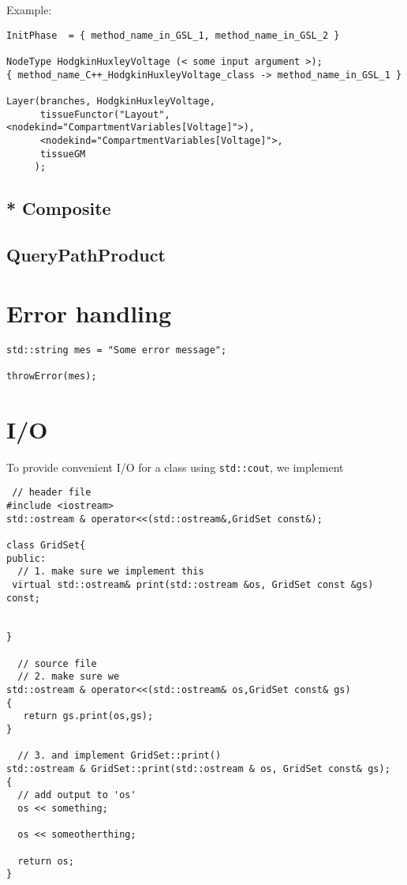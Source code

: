 Example:
\begin{verbatim}
InitPhase  = { method_name_in_GSL_1, method_name_in_GSL_2 }

NodeType HodgkinHuxleyVoltage (< some input argument >); 
{ method_name_C++_HodgkinHuxleyVoltage_class -> method_name_in_GSL_1 }

Layer(branches, HodgkinHuxleyVoltage, 
      tissueFunctor("Layout", <nodekind="CompartmentVariables[Voltage]">),
      <nodekind="CompartmentVariables[Voltage]">, 
      tissueGM
     );

\end{verbatim}


\subsection{* Composite}
\label{sec:GSL-script-Composite}
\label{sec:GSL-repertoire-composite}


\subsection{QueryPathProduct}





\section{Error handling}

\begin{verbatim}
std::string mes = "Some error message";

throwError(mes);
\end{verbatim}

\section{I/O }
\label{sec:NTS-IO-classes}
\label{sec:GSL-IO-classes}

To provide convenient I/O for a class using \verb!std::cout!, we implement
\begin{verbatim}
 // header file
#include <iostream>
std::ostream & operator<<(std::ostream&,GridSet const&);

class GridSet{
public:
  // 1. make sure we implement this
 virtual std::ostream& print(std::ostream &os, GridSet const &gs) const;


}

  // source file
  // 2. make sure we 
std::ostream & operator<<(std::ostream& os,GridSet const& gs)
{
   return gs.print(os,gs);
}

  // 3. and implement GridSet::print() 
std::ostream & GridSet::print(std::ostream & os, GridSet const& gs);
{
  // add output to 'os'
  os << something;
  
  os << someotherthing;

  return os;
}
\end{verbatim}

